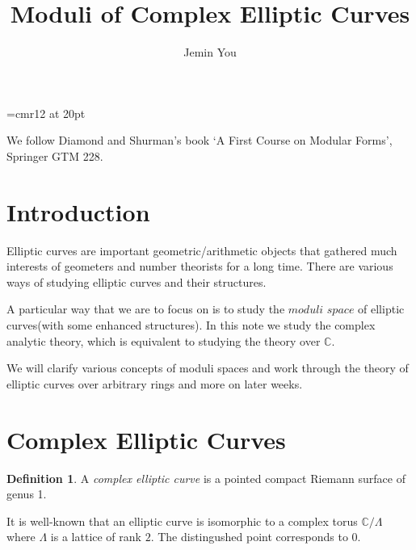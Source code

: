 \documentclass[a4paper,11pt]{article}
\begin{document}
\theoremstyle{plain}
\newtheorem{thm}{Theorem}[section]
\newtheorem{prp}[thm]{Proposition}
\newtheorem{lem}[thm]{Lemma}

\theoremstyle{definition}
\newtheorem{defn}[thm]{Definition}
\newtheorem{exm}[thm]{Example}
\newtheorem{nota}[thm]{Notation}

\theoremstyle{remark}
\newtheorem{rem}[thm]{Remark}



\font\myfont=cmr12 at 20pt

\title{\vspace{-5ex} \myfont Moduli of Complex Elliptic Curves}
\author{Jemin You}
\date{\vspace{-5ex}}
\maketitle

\setcounter{section}{-1}

We follow Diamond and Shurman's book `A First Course on Modular Forms', Springer GTM 228.

\section{Introduction}

Elliptic curves are important geometric/arithmetic objects that gathered much interests of geometers and number theorists for a long time.
There are various ways of studying elliptic curves and their structures.

A particular way that we are to focus on is to study the $\textit{moduli space}$ of elliptic curves(with some enhanced structures).
In this note we study the complex analytic theory, which is equivalent to studying the theory over $\mathbb{C}$.

We will clarify various concepts of moduli spaces and work through the theory of elliptic curves over arbitrary rings and more on later weeks.

\section{Complex Elliptic Curves}

\begin{defn}
A \textit{complex elliptic curve} is a pointed compact Riemann surface of genus 1.
\end{defn}

It is well-known that an elliptic curve is isomorphic to a complex torus $\mathbb{C}/\Lambda$ where $\Lambda$ is a lattice of rank $2$.
The distingushed point corresponds to $0$.
\end{document}
